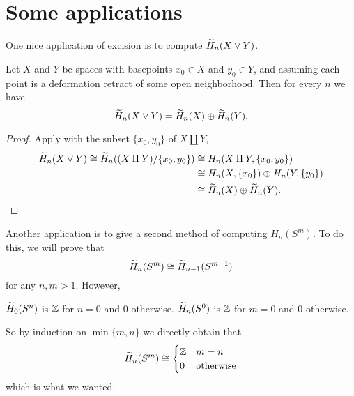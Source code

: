 \section{Some applications}
One nice application of excision is to compute $\widetilde H_n(X \vee Y)$.
\begin{theorem}
	Let $X$ and $Y$ be spaces with basepoints $x_0 \in X$ and $y_0 \in Y$,
	and assuming each point is a deformation retract of some open neighborhood.
	Then for every $n$ we have
	\[
		\widetilde H_n(X \vee Y)
		= \widetilde H_n(X) \oplus \widetilde H_n(Y).
	\]
\end{theorem}
\begin{proof}
	Apply  with the subset $\{x_0, y_0\}$ of $X \amalg Y$,
	\begin{align*}
		\widetilde H_n (X \vee Y)
		\cong \widetilde H_n( (X \amalg Y) / \{x_0, y_0\} )
		&\cong H_n(X \amalg Y, \{x_0,y_0\}) \\
		&\cong H_n(X, \{x_0\}) \oplus H_n(Y, \{y_0\}) \\
		&\cong\widetilde H_n(X) \oplus \widetilde H_n(Y). \qedhere
	\end{align*}
\end{proof}

Another application is to give a second method
of computing $H_n(S^m)$.
To do this, we will prove that
\[ \widetilde H_n(S^m) \cong \widetilde H_{n-1}(S^{m-1}) \]
for any $n,m > 1$.
However,
\begin{itemize}
	\ii $\widetilde H_0(S^n)$ is $\mathbb Z$ for $n=0$ and $0$ otherwise.
	\ii $\widetilde H_n(S^0)$ is $\mathbb Z$ for $m=0$ and $0$ otherwise.
\end{itemize}
So by induction on $\min \{m,n\}$ we directly obtain that
\[
	\widetilde H_n(S^m) \cong
	\begin{cases}
		\mathbb Z & m=n \\
		0 & \text{otherwise}
	\end{cases}
\]
which is what we wanted.

